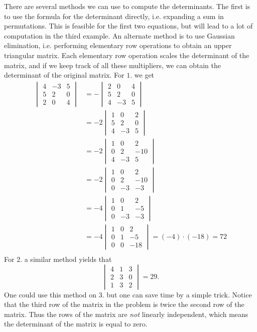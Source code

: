 \documentclass[12pt,a4paper]{article}
\theoremstyle{definition}
\begin{document}
\begin{solution}
	There are several methods we can use to compute the determinants. The first is to use the formula for the determinant directly, i.e. expanding a sum in permutations. This is feasible for the first two equations, but will lead to a lot of computation in the third example. An alternate method is to use Gaussian elimination, i.e. performing elementary row operations to obtain an upper triangular matrix. Each elementary row operation scales the determinant of the matrix, and if we keep track of all these multipliers, we can obtain the determinant of the original matrix. For $1.$ we get 
\begin{align*}
    \begin{vmatrix}  4 & -3 & 5 \\ 5 & 2 & 0 \\ 2 & 0 & 4 \end{vmatrix} &= -\begin{vmatrix} 2 & 0 & 4 \\ 5 & 2 & 0 \\ 4 & -3 & 5  \end{vmatrix}\\
    &= -2\begin{vmatrix} 1 & 0 & 2 \\ 5 & 2 & 0 \\ 4 & -3 & 5  \end{vmatrix}\\
    &= -2\begin{vmatrix} 1 & 0 & 2 \\ 0 & 2 & -10 \\ 4 & -3 & 5  \end{vmatrix}\\
    &= -2\begin{vmatrix} 1 & 0 & 2 \\ 0 & 2 & -10 \\ 0 & -3 & -3  \end{vmatrix}\\
    &= -4\begin{vmatrix} 1 & 0 & 2 \\ 0 & 1 & -5 \\ 0 & -3 & -3  \end{vmatrix}\\
    &= -4\begin{vmatrix} 1 & 0 & 2 \\ 0 & 1 & -5 \\ 0 & 0 & -18  \end{vmatrix}=(-4)\cdot (-18)=72\\
\end{align*}
%
 For $2.$ a similar method yields that
 \[ \begin{vmatrix}  4 & 1 & 3 \\ 2 & 3 & 0 \\ 1 & 3 & 2 \end{vmatrix}=29. \]
 One could use this method on $3.$ but one can save time by a simple trick. Notice that the third row of the matrix in the problem is twice the second row of the matrix. Thus the rows of the matrix are \emph{not} linearly independent, which means the determinant of the matrix is equal to zero.
\end{solution}
\end{document}
